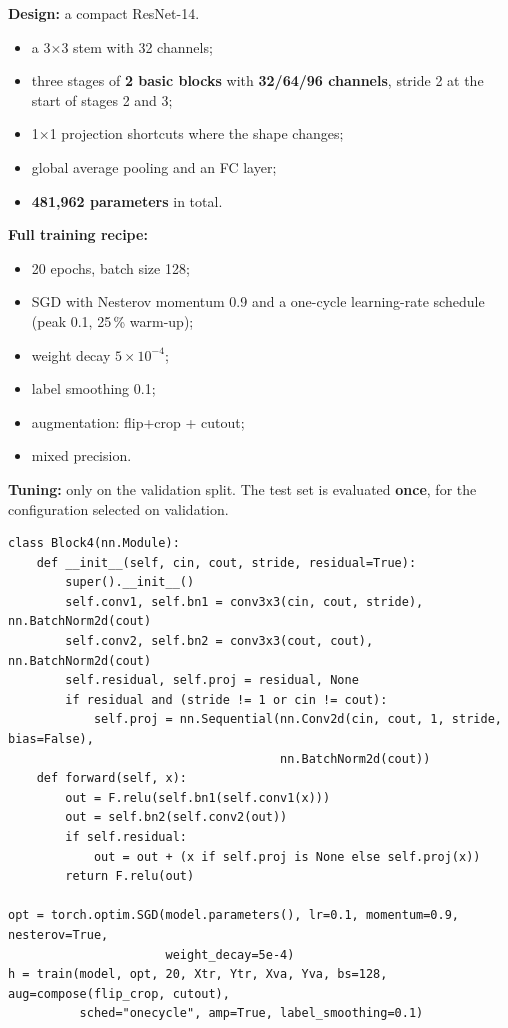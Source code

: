 \documentclass[11pt,a4paper]{article}
\begin{document}
\textbf{Design:} a compact ResNet-14.
\begin{itemize}
  \item a 3$\times$3 stem with 32 channels;
  \item three stages of \textbf{2 basic blocks} with \textbf{32/64/96 channels}, stride 2 at the start of stages 2 and 3;
  \item 1$\times$1 projection shortcuts where the shape changes;
  \item global average pooling and an FC layer;
  \item \textbf{481{,}962 parameters} in total.
\end{itemize}

\textbf{Full training recipe:}
\begin{itemize}
  \item 20 epochs, batch size 128;
  \item SGD with Nesterov momentum 0.9 and a one-cycle learning-rate schedule (peak 0.1, 25\,\% warm-up);
  \item weight decay $5\times10^{-4}$;
  \item label smoothing 0.1;
  \item augmentation: flip+crop + cutout;
  \item mixed precision.
\end{itemize}

\textbf{Tuning:} only on the validation split. The test set is evaluated \textbf{once}, for the configuration selected on validation.

\begin{lstlisting}
class Block4(nn.Module):
    def __init__(self, cin, cout, stride, residual=True):
        super().__init__()
        self.conv1, self.bn1 = conv3x3(cin, cout, stride), nn.BatchNorm2d(cout)
        self.conv2, self.bn2 = conv3x3(cout, cout), nn.BatchNorm2d(cout)
        self.residual, self.proj = residual, None
        if residual and (stride != 1 or cin != cout):
            self.proj = nn.Sequential(nn.Conv2d(cin, cout, 1, stride, bias=False),
                                      nn.BatchNorm2d(cout))
    def forward(self, x):
        out = F.relu(self.bn1(self.conv1(x)))
        out = self.bn2(self.conv2(out))
        if self.residual:
            out = out + (x if self.proj is None else self.proj(x))
        return F.relu(out)

opt = torch.optim.SGD(model.parameters(), lr=0.1, momentum=0.9, nesterov=True,
                      weight_decay=5e-4)
h = train(model, opt, 20, Xtr, Ytr, Xva, Yva, bs=128, aug=compose(flip_crop, cutout),
          sched="onecycle", amp=True, label_smoothing=0.1)
\end{lstlisting}
\end{document}
